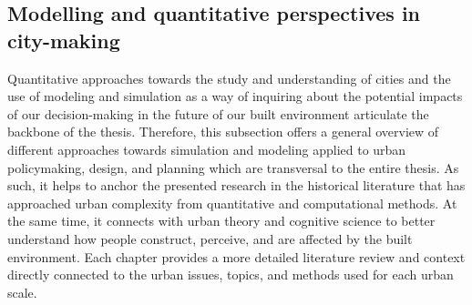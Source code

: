 \subsection{Modelling and quantitative perspectives in city-making}

Quantitative approaches towards the study and understanding of cities and the use of modeling and simulation as a way of inquiring about the potential impacts of our decision-making in the future of our built environment articulate the backbone of the thesis. Therefore, this subsection offers a general overview of different approaches towards simulation and modeling applied to urban policymaking, design, and planning which are transversal to the entire thesis. As such, it helps to anchor the presented research in the historical literature that has approached urban complexity from quantitative and computational methods. At the same time, it connects with urban theory and cognitive science to better understand how people construct, perceive, and are affected by the built environment. Each chapter provides a more detailed literature review and context directly connected to the urban issues, topics, and methods used for each urban scale.

